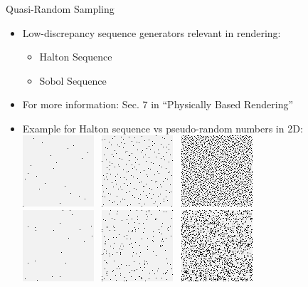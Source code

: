 \documentclass[utf8,stillsansserifmath,fleqn,t]{beamer}
\begin{document}
\begin{frame}
\frametitle{\insertsection}
Quasi-Random Sampling
\begin{itemize}
\item Low-discrepancy sequence generators relevant in rendering:
    \begin{itemize}
    \item Halton Sequence
    \item Sobol Sequence
    \end{itemize}
\item For more information: Sec. 7 in ``Physically Based Rendering''
\item Example for Halton sequence vs pseudo-random numbers in 2D:\\
\includegraphics[width=.19\textwidth]{./fig/halton-vs-prng-halton-20.tad.png}~
\includegraphics[width=.19\textwidth]{./fig/halton-vs-prng-halton-200.tad.png}~
\includegraphics[width=.19\textwidth]{./fig/halton-vs-prng-halton-2000.tad.png}\\[1ex]
\includegraphics[width=.19\textwidth]{./fig/halton-vs-prng-prng-20.tad.png}~
\includegraphics[width=.19\textwidth]{./fig/halton-vs-prng-prng-200.tad.png}~
\includegraphics[width=.19\textwidth]{./fig/halton-vs-prng-prng-2000.tad.png}\\
\end{itemize}
\end{frame}
\end{document}
